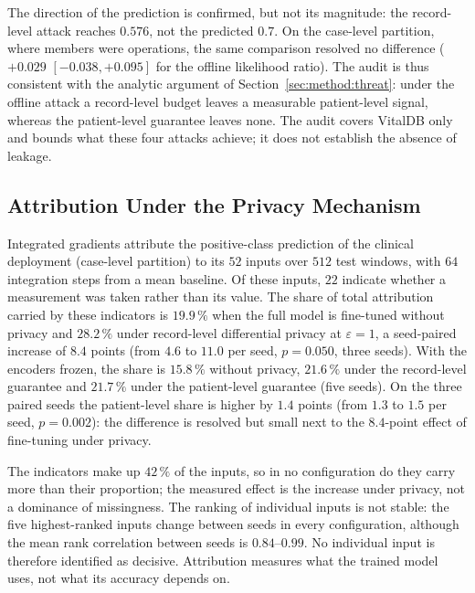 The direction of the prediction is confirmed, but not its magnitude: the
record-level attack reaches $0.576$, not the predicted $0.7$. On the
case-level partition, where members were operations, the same comparison
resolved no difference ($+0.029$ $[-0.038, +0.095]$ for the offline
likelihood ratio). The audit is thus consistent with the analytic argument of
Section~\ref{sec:method:threat}: under the offline attack a record-level
budget leaves a measurable patient-level signal, whereas the patient-level
guarantee leaves none. The audit covers VitalDB only and bounds what these
four attacks achieve; it does not establish the absence of leakage.

\subsection{Attribution Under the Privacy Mechanism}
\label{sec:results:attribution}

Integrated gradients attribute the positive-class prediction of the clinical
deployment (case-level partition) to its $52$ inputs over $512$ test windows, with $64$ integration
steps from a mean baseline. Of these inputs, $22$ indicate whether a measurement
was taken rather than its value. The share of total attribution carried by
these indicators is $19.9\,\%$ when the full model is fine-tuned without privacy
and $28.2\,\%$ under record-level differential privacy at $\varepsilon = 1$, a
seed-paired increase of $8.4$ points (from $4.6$ to $11.0$ per seed, $p = 0.050$,
three seeds). With the encoders frozen, the share is $15.8\,\%$ without privacy,
$21.6\,\%$ under the record-level guarantee and $21.7\,\%$ under the
patient-level guarantee (five seeds). On the three paired seeds the
patient-level share is higher by $1.4$ points (from $1.3$ to $1.5$ per seed,
$p = 0.002$): the difference is resolved but small next to the $8.4$-point
effect of fine-tuning under privacy.

The indicators make up $42\,\%$ of the inputs, so in no configuration do they
carry more than their proportion; the measured effect is the increase under
privacy, not a dominance of missingness. The ranking of individual inputs is
not stable: the five highest-ranked inputs change between seeds in every
configuration, although the mean rank correlation between seeds is
$0.84$--$0.99$. No individual input is therefore identified as decisive.
Attribution measures what the trained model uses, not what its accuracy
depends on.

